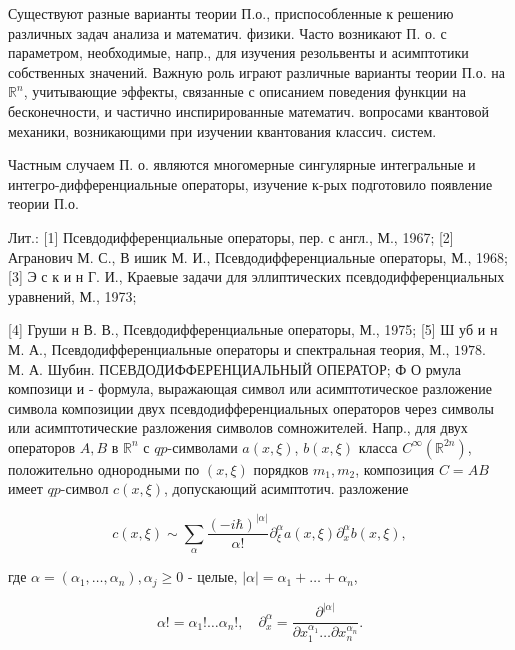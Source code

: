 \documentclass[10pt]{article}
\begin{document}
Существуют разные варианты теории П.о., приспособленные к решению различных задач анализа и математич. физики. Часто возникают П. о. с параметром, необходимые, напр., для изучения резольвенты и асимптотики собственных значений. Важную роль играют различные варианты теории П.о. на $\mathbb{R}^{n}$, учитывающие эффекты, связанные с описанием поведения функции на бесконечности, и частично инспирированные математич. вопросами квантовой механики, возникающими при изучении квантования классич. систем.



Частным случаем П. о. являются многомерные сингулярные интегральные и интегро-дифференциальные операторы, изучение к-рых подготовило появление теории П.о.



Лит.: [1] Псевдодифференциальные операторы, пер. с англ., М., 1967; [2] Агранович М. С., В ишик М. И., Псевдодифференциальные операторы, М., 1968; [3] Э с к и н Г. И., Краевые задачи для эллиптических псевдодифференциальных уравнений, М., 1973;



[4] Груши н В. В., Псевдодифференциальные операторы, М., 1975; [5] Ш уб и н М. А., Псевдодифференциальные операторы и спектральная теория, М., $1978 . \quad$ М. А. Шубин. ПСЕВДОДИФФЕРЕНЦИАЛЬНЫЙ ОПЕРАТОР; Ф О рмула композици и - формула, выражающая символ или асимптотическое разложение символа композиции двух псевдодифференциальных операторов через символы или асимптотические разложения символов сомножителей. Напр., для двух операторов $A, B$ в $\mathbb{R}^{n}$ с $q p$-символами $a(x, \xi)$, $b(x, \xi)$ класса $C^{\infty}\left(\mathbb{R}^{2 n}\right)$, положительно однородными по $(x, \xi)$ порядков $m_{1}, m_{2}$, композиция $C=A B$ имеет $q p$-символ $c(x, \xi)$, допускающий асимптотич. разложение



\[

c(x, \xi) \sim \sum_{\alpha} \frac{(-i \hbar)^{|\alpha|}}{\alpha !} \partial_{\xi}^{\alpha} a(x, \xi) \partial_{x}^{\alpha} b(x, \xi),

\]



где $\alpha=\left(\alpha_{1}, \ldots, \alpha_{n}\right), \alpha_{j} \geqslant 0$ - целые, $|\alpha|=\alpha_{1}+\ldots+\alpha_{n}$,



\[

\alpha !=\alpha_{1} ! \ldots \alpha_{n} !, \quad \partial_{x}^{\alpha}=\frac{\partial^{|\alpha|}}{\partial x_{1}^{\alpha_{1}} \ldots \partial x_{n}^{\alpha_{n}}} .

\]
\end{document}
